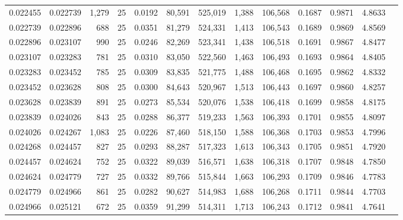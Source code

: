 \begin{tabular}{rrrrrrrrrrrrr}
0.022455 & 0.022739 & 1,279 &  25 &                                     0.0192 &  80,591 & 525,019 &   1,388 & 106,568 & 0.1687 & 0.9871 & 4.8633 \\
0.022739 & 0.022896 &   688 &  25 &                                     0.0351 &  81,279 & 524,331 &   1,413 & 106,543 & 0.1689 & 0.9869 & 4.8569 \\
0.022896 & 0.023107 &   990 &  25 &                                     0.0246 &  82,269 & 523,341 &   1,438 & 106,518 & 0.1691 & 0.9867 & 4.8477 \\
0.023107 & 0.023283 &   781 &  25 &                                     0.0310 &  83,050 & 522,560 &   1,463 & 106,493 & 0.1693 & 0.9864 & 4.8405 \\
0.023283 & 0.023452 &   785 &  25 &                                     0.0309 &  83,835 & 521,775 &   1,488 & 106,468 & 0.1695 & 0.9862 & 4.8332 \\
0.023452 & 0.023628 &   808 &  25 &                                     0.0300 &  84,643 & 520,967 &   1,513 & 106,443 & 0.1697 & 0.9860 & 4.8257 \\
0.023628 & 0.023839 &   891 &  25 &                                     0.0273 &  85,534 & 520,076 &   1,538 & 106,418 & 0.1699 & 0.9858 & 4.8175 \\
0.023839 & 0.024026 &   843 &  25 &                                     0.0288 &  86,377 & 519,233 &   1,563 & 106,393 & 0.1701 & 0.9855 & 4.8097 \\
0.024026 & 0.024267 & 1,083 &  25 &                                     0.0226 &  87,460 & 518,150 &   1,588 & 106,368 & 0.1703 & 0.9853 & 4.7996 \\
0.024268 & 0.024457 &   827 &  25 &                                     0.0293 &  88,287 & 517,323 &   1,613 & 106,343 & 0.1705 & 0.9851 & 4.7920 \\
0.024457 & 0.024624 &   752 &  25 &                                     0.0322 &  89,039 & 516,571 &   1,638 & 106,318 & 0.1707 & 0.9848 & 4.7850 \\
0.024624 & 0.024779 &   727 &  25 &                                     0.0332 &  89,766 & 515,844 &   1,663 & 106,293 & 0.1709 & 0.9846 & 4.7783 \\
0.024779 & 0.024966 &   861 &  25 &                                     0.0282 &  90,627 & 514,983 &   1,688 & 106,268 & 0.1711 & 0.9844 & 4.7703 \\
0.024966 & 0.025121 &   672 &  25 &                                     0.0359 &  91,299 & 514,311 &   1,713 & 106,243 & 0.1712 & 0.9841 & 4.7641 \\

\end{tabular}
